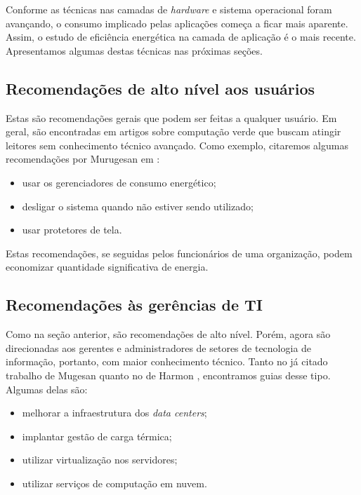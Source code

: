Conforme as técnicas nas camadas de \emph{hardware} e sistema operacional foram avançando, o consumo implicado pelas aplicações começa a ficar mais aparente. Assim, o estudo de eficiência energética na camada de aplicação é o mais recente. Apresentamos algumas destas técnicas nas próximas seções.

\subsection{Recomendações de alto nível aos usuários}

Estas são recomendações gerais que podem ser feitas a qualquer usuário. Em geral, são encontradas em artigos sobre computação verde que buscam atingir leitores sem conhecimento técnico avançado. Como exemplo, citaremos algumas recomendações por Murugesan em \cite{murugesan2008harnessing}:
\begin{itemize}
    \item usar os gerenciadores de consumo energético;
    \item desligar o sistema quando não estiver sendo utilizado;
    \item usar protetores de tela.
\end{itemize}

Estas recomendações, se seguidas pelos funcionários de uma organização, podem economizar quantidade significativa de energia.

\subsection{Recomendações às gerências de TI}

Como na seção anterior, são recomendações de alto nível. Porém, agora são direcionadas aos gerentes e administradores de setores de tecnologia de informação, portanto, com maior conhecimento técnico. Tanto no já citado trabalho de Mugesan \cite{murugesan2008harnessing} quanto no de Harmon \cite{harmon2009sustainable}, encontramos guias desse tipo. Algumas delas são:
\begin{itemize}
    \item melhorar a infraestrutura dos \emph{data centers};
    \item implantar gestão de carga térmica;
    \item utilizar virtualização nos servidores;
    \item utilizar serviços de computação em nuvem.
\end{itemize}

